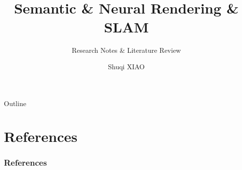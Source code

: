\documentclass[
    10pt,
    aspectratio=1610,
    xcolor={dvipsnames,pst},
]{beamer}
\title{Semantic \& Neural Rendering \& SLAM}
\subtitle{Research Notes \& Literature Review}
\author{Shuqi XIAO}
\begin{document}
% 

\maketitle

\begin{frame}{Outline}
	\tableofcontents
\end{frame}








\appendix %
\section{References} %

\begin{frame}[allowframebreaks]
	\frametitle{References}
	\printbibliography[heading=none]
\end{frame}
\end{document}
